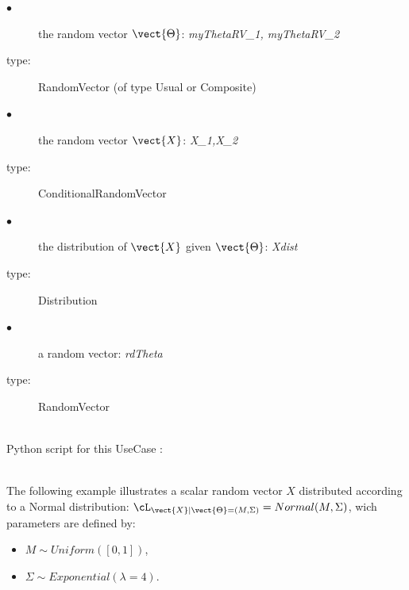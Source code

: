 {
  \begin{description}
   \item[$\bullet$] the random vector $\vect{\Theta}$: {\itshape myThetaRV\_1, myThetaRV\_2}
  \item[type:]  RandomVector (of type Usual or Composite)
  \item[$\bullet$] the random vector $\vect{X}$: {\itshape X\_1,X\_2}
  \item[type:]  ConditionalRandomVector
   \item[$\bullet$] the distribution of $\vect{X}$ given $\vect{\Theta}$:  {\itshape Xdist }
  \item[type:] Distribution
  \item[$\bullet$] a random vector: {\itshape rdTheta}
  \item[type:] RandomVector
  \end{description}
}

\textspace\\
Python script for this UseCase :


\textspace\\

The following example illustrates a scalar random vector $X$ distributed according to a Normal distribution: $\cL_{\vect{X}|\vect{\Theta}=(M, \Sigma)} = Normal(M, \Sigma)$, wich parameters are defined by:
\begin{itemize}
\item $M \sim Uniform([0,1])$,
\item $\Sigma \sim Exponential(\lambda=4)$.
\end{itemize}


